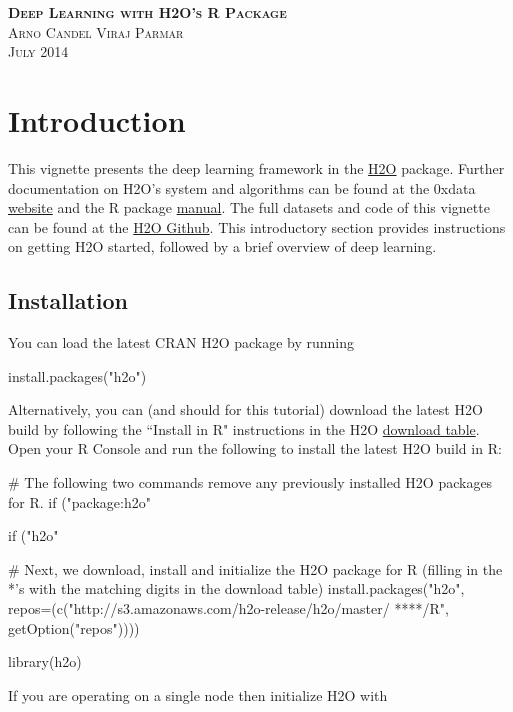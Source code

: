 \documentclass[12pt]{article}
\begin{document}
\thispagestyle{empty} %

\begin{center}
\textsc{\Large\bf{Deep Learning with H2O's R Package}}
\\
\bigskip
\textsc{Arno Candel \hspace{40pt} Viraj Parmar}
\\
\bigskip
\textsc{July 2014}
\end{center}


\bigskip

\bigskip


\tableofcontents

\newpage


\section{Introduction}

This vignette presents the deep learning framework in the \href{http://cran.r-project.org/web/packages/h2o/index.html}{H2O} package. Further documentation on H2O's system and algorithms can be found at the 0xdata \href{http://docs.0xdata.com}{website} and the R package \href{http://cran.r-project.org/web/packages/h2o/h2o.pdf}{manual}. The full datasets and code of this vignette can be found at the \href{https://github.com/0xdata/h2o/tree/master/docs/deeplearning/DeepLearningRVignetteDemo}{H2O Github}. This introductory section provides instructions on getting H2O started, followed by a brief overview of deep learning.

\subsection{Installation}

You can load the latest CRAN H2O package by running

\begin{spverbatim}
install.packages("h2o")
\end{spverbatim}
\bigskip
\noindent
Alternatively, you can (and should for this tutorial) download the latest H2O build by following the ``Install in R" instructions in the H2O \href{http://s3.amazonaws.com/h2o-release/h2o/master/latest.html}{download table}. Open your R Console and run the following to install the latest H2O build in R:

\begin{spverbatim}
# The following two commands remove any previously installed H2O packages for R.
if ("package:h2o" %

if ("h2o" %

# Next, we download, install and initialize the H2O package for R (filling in the *'s with the matching digits in the download table)
install.packages("h2o", repos=(c("http://s3.amazonaws.com/h2o-release/h2o/master/
****/R", getOption("repos"))))

library(h2o)

\end{spverbatim}
\noindent
If you are operating on a single node then initialize H2O with
\end{document}
